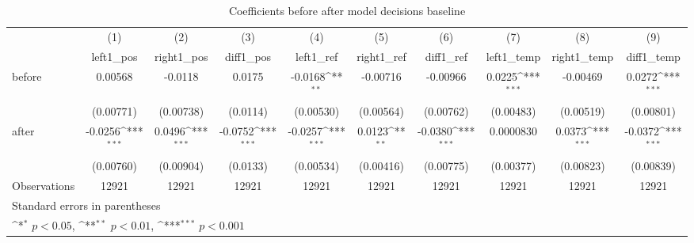 \begin{table}[htbp]\centering
\def\sym#1{\ifmmode^{#1}\else\(^{#1}\)\fi}
\caption{Coefficients before after model decisions baseline}
\begin{tabular}{l*{9}{c}}
\hline\hline
                    &\multicolumn{1}{c}{(1)}&\multicolumn{1}{c}{(2)}&\multicolumn{1}{c}{(3)}&\multicolumn{1}{c}{(4)}&\multicolumn{1}{c}{(5)}&\multicolumn{1}{c}{(6)}&\multicolumn{1}{c}{(7)}&\multicolumn{1}{c}{(8)}&\multicolumn{1}{c}{(9)}\\
                    &\multicolumn{1}{c}{left1\_pos}&\multicolumn{1}{c}{right1\_pos}&\multicolumn{1}{c}{diff1\_pos}&\multicolumn{1}{c}{left1\_ref}&\multicolumn{1}{c}{right1\_ref}&\multicolumn{1}{c}{diff1\_ref}&\multicolumn{1}{c}{left1\_temp}&\multicolumn{1}{c}{right1\_temp}&\multicolumn{1}{c}{diff1\_temp}\\
\hline
before              &     0.00568         &     -0.0118         &      0.0175         &     -0.0168\sym{**} &    -0.00716         &    -0.00966         &      0.0225\sym{***}&    -0.00469         &      0.0272\sym{***}\\
                    &   (0.00771)         &   (0.00738)         &    (0.0114)         &   (0.00530)         &   (0.00564)         &   (0.00762)         &   (0.00483)         &   (0.00519)         &   (0.00801)         \\
[1em]
after               &     -0.0256\sym{***}&      0.0496\sym{***}&     -0.0752\sym{***}&     -0.0257\sym{***}&      0.0123\sym{**} &     -0.0380\sym{***}&   0.0000830         &      0.0373\sym{***}&     -0.0372\sym{***}\\
                    &   (0.00760)         &   (0.00904)         &    (0.0133)         &   (0.00534)         &   (0.00416)         &   (0.00775)         &   (0.00377)         &   (0.00823)         &   (0.00839)         \\
\hline
Observations        &       12921         &       12921         &       12921         &       12921         &       12921         &       12921         &       12921         &       12921         &       12921         \\
\hline\hline
\multicolumn{10}{l}{\footnotesize Standard errors in parentheses}\\
\multicolumn{10}{l}{\footnotesize \sym{*} \(p<0.05\), \sym{**} \(p<0.01\), \sym{***} \(p<0.001\)}\\
\end{tabular}
\end{table}
